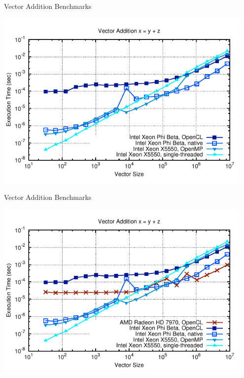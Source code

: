 \begin{frame}{Vector Addition Benchmarks}
  \begin{center}
   \includegraphics[width=0.95\textwidth]{figures/vector-timings-4}
  \end{center}
\end{frame}

\begin{frame}{Vector Addition Benchmarks}
  \begin{center}
   \includegraphics[width=0.95\textwidth]{figures/vector-timings-5}
  \end{center}
\end{frame}

